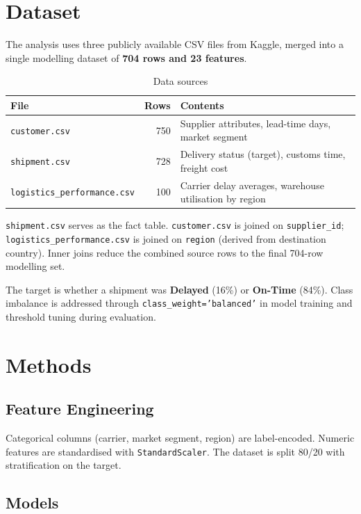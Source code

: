 \documentclass[runningheads]{llncs}
\begin{document}
\section{Dataset}

The analysis uses three publicly available CSV files from Kaggle, merged into a
single modelling dataset of \textbf{704 rows and 23 features}.

\begin{table}[h]
\caption{Data sources}\label{tab:data}
\begin{tabular}{lrl}
\toprule
File & Rows & Contents \\
\midrule
\texttt{customer.csv}              & 750 & Supplier attributes, lead-time days, market segment \\
\texttt{shipment.csv}              & 728 & Delivery status (target), customs time, freight cost \\
\texttt{logistics\_performance.csv} & 100 & Carrier delay averages, warehouse utilisation by region \\
\bottomrule
\end{tabular}
\end{table}

\texttt{shipment.csv} serves as the fact table. \texttt{customer.csv} is joined
on \texttt{supplier\_id}; \texttt{logistics\_performance.csv} is joined on
\texttt{region} (derived from destination country). Inner joins reduce the
combined source rows to the final 704-row modelling set.

The target is whether a shipment was \textbf{Delayed} (16\%) or \textbf{On-Time}
(84\%). Class imbalance is addressed through \texttt{class\_weight='balanced'} in
model training and threshold tuning during evaluation.


\section{Methods}

\subsection{Feature Engineering}

Categorical columns (carrier, market segment, region) are label-encoded.
Numeric features are standardised with \texttt{StandardScaler}. The dataset is
split 80/20 with stratification on the target.

\subsection{Models}
\end{document}
